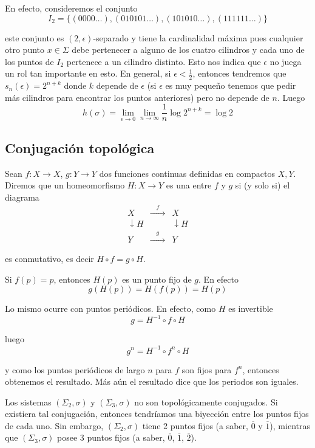 \documentclass[	docname= Sistemas\ Din\'amicos,
				finished=1,
				semester=1,
				year=2017,
				professor=Godofredo\ Iommi,
				sigla=MAT2565]{apunte}
\begin{document}
\begin{ex}
En efecto, consideremos el conjunto
	$$I_{2} = \{(0000\ldots), (010101\ldots), (101010\ldots), (111111\ldots) \}$$

este conjunto es $(2,\epsilon)$-separado y tiene la cardinalidad máxima pues cualquier otro punto $x \in \Sigma$ debe pertenecer a alguno de los cuatro cilindros y cada uno de los puntos de $I_{2}$ pertenece a un cilindro distinto. Esto nos indica que $\epsilon$ no juega un rol tan importante en esto. En general, si $\epsilon < \frac{1}{2}$, entonces tendremos que $s_{n}(\epsilon) = 2^{n+k}$ donde $k$ depende de $\epsilon$ (si $\epsilon$ es muy pequeño tenemos que pedir más cilindros para encontrar los puntos anteriores) pero no depende de $n$. Luego
	$$h(\sigma) = \lim_{\epsilon \to 0} \lim_{n \to \infty} \frac{1}{n} \log 2^{n+k} = \log 2$$
\end{ex} 

\subsection{Conjugación topológica}
\begin{defn} Sean $f: X \to X$, $g: Y \to Y$ dos funciones continuas definidas en compactos $X,Y$. Diremos que un homeomorfismo $H: X \to Y$ es una  entre $f$ y $g$ si (y solo si) el diagrama
	$$\begin{array}{ccc}
		X			&	\xrightarrow{\quad f \quad}	&	X	\\
		\downarrow H	&							&	\downarrow H	\\
		Y			&	\xrightarrow{\quad g \quad}	&	Y
	\end{array}$$

es conmutativo, es decir $H \circ f = g \circ H$.
\end{defn}

\begin{obsd} Si $f(p) = p$, entonces $H(p)$ es un punto fijo de $g$. En efecto
	$$g(H(p)) = H(f(p)) = H(p)$$

Lo mismo ocurre con puntos periódicos. En efecto, como $H$ es invertible
	$$g = H^{-1} \circ f \circ H$$

luego
	$$g^{n} = H^{-1} \circ f^{n} \circ H$$

y como los puntos periódicos de largo $n$ para $f$ son fijos para $f^{n}$, entonces obtenemos el resultado. Más aún el resultado dice que los periodos son iguales.
\end{obsd}

\begin{ex} Los sistemas $(\Sigma_{2}, \sigma)$ y $(\Sigma_{3}, \sigma)$ no son topológicamente conjugados. Si existiera tal conjugación, entonces tendríamos una biyección entre los puntos fijos de cada uno. Sin embargo, $(\Sigma_{2}, \sigma)$ tiene 2 puntos fijos (a saber, $\overline{0}$ y $\overline{1}$), mientras que $(\Sigma_{3}, \sigma)$ posee 3 puntos fijos (a saber, $\overline{0}$, $\overline{1}$, $\overline{2}$).
\end{ex}
\end{document}
